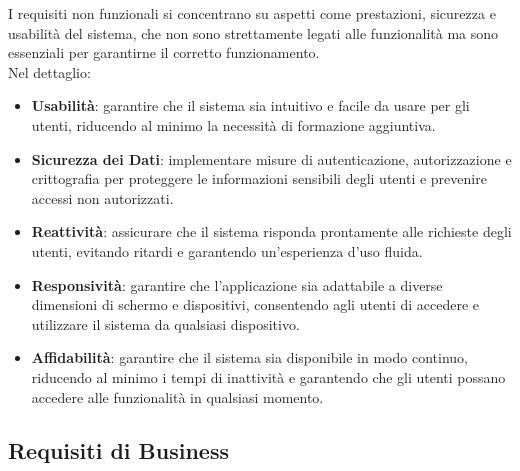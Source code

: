 I requisiti non funzionali si concentrano su aspetti come prestazioni,
sicurezza e usabilità del sistema, che non sono strettamente legati alle funzionalità ma sono
essenziali per garantirne il corretto funzionamento.\\
Nel dettaglio:
\begin{itemize}
    \item \textbf{Usabilità}: garantire che il sistema sia intuitivo e facile da usare per gli utenti, riducendo al minimo la necessità di formazione aggiuntiva.
    \item \textbf{Sicurezza dei Dati}: implementare misure di autenticazione, autorizzazione e crittografia per proteggere le informazioni sensibili degli utenti e prevenire accessi non autorizzati.
    \item \textbf{Reattività}: assicurare che il sistema risponda prontamente alle richieste degli utenti, evitando ritardi e garantendo un'esperienza d'uso fluida.
    \item \textbf{Responsività}: garantire che l'applicazione sia adattabile a diverse dimensioni di schermo e dispositivi, consentendo agli utenti di accedere e utilizzare il sistema da qualsiasi dispositivo.
    \item \textbf{Affidabilità}: garantire che il sistema sia disponibile in modo continuo, riducendo al minimo i tempi di inattività e garantendo che gli utenti possano accedere alle funzionalità in qualsiasi momento.
\end{itemize}

\subsection{Requisiti di Business}

